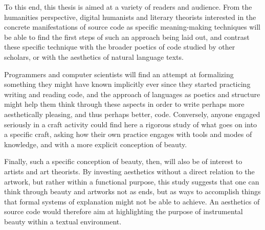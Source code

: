 To this end, this thesis is aimed at a variety of readers and audience. From the humanities perspective, digital humanists and literary theorists interested in the concrete manifestations of source code as specific meaning-making techniques will be able to find the first steps of such an approach being laid out, and contrast these specific technique with the broader poetics of code studied by other scholars, or with the aesthetics of natural language texts.

Programmers and computer scientists will find an attempt at formalizing something they might have known implicitly ever since they started practicing writing and reading code, and the approach of languages as poetics and structure might help them think through these aspects in order to write perhaps more aesthetically pleasing, and thus perhaps better, code. Conversely, anyone engaged seriously in a craft activity could find here a rigorous study of what goes on into a specific craft, asking how their own practice engages with tools and modes of knowledge, and with a more explicit conception of beauty.

Finally, such a specific conception of beauty, then, will also be of interest to artists and art theorists. By investing aesthetics without a direct relation to the artwork, but rather within a functional purpose, this study suggests that one can think through beauty and artworks not as ends, but as ways to accomplish things that formal systems of explanation might not be able to achieve. An aesthetics of source code would therefore aim at highlighting the purpose of instrumental beauty within a textual environment.